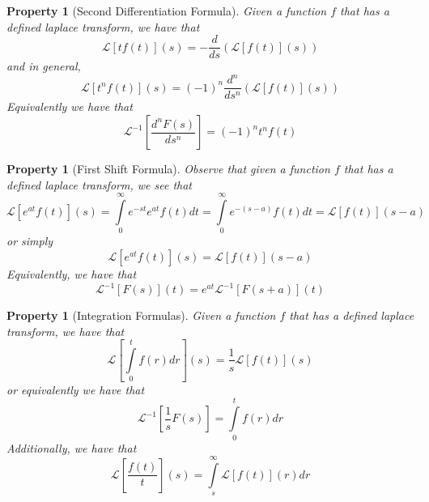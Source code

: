\documentclass[12pt]{article}
\newtheorem{pro}[thm]{Property}
\theoremstyle{definition}
\theoremstyle{remark}
\numberwithin{equation}{section}
\begin{document}
\begin{pro}[Second Differentiation Formula]
        Given a function $f$ that has a defined laplace transform, we have that \begin{equation}
                \mathcal{L}[tf(t)](s) = -\frac{d}{ds}\left(\mathcal{L}[f(t)](s)\right)
        \end{equation}
        and in general, \begin{equation}
                \mathcal{L}[t^nf(t)](s) = (-1)^n\frac{d^n}{ds^n}\left(\mathcal{L}[f(t)](s)\right)
        \end{equation}
        Equivalently we have that \begin{equation}
                \mathcal{L}^{-1}\left[\frac{d^nF(s)}{ds^n}\right] = (-1)^nt^nf(t)
        \end{equation}
\end{pro}


\vspace{1cm}


\begin{pro}[First Shift Formula]
        Observe that given a function $f$ that has a defined laplace transform, we see that \begin{equation}
                \mathcal{L}[e^{at}f(t)](s) = \int\limits_0^{\infty}e^{-st}e^{at}f(t)dt = \int\limits_0^{\infty}e^{-(s-a)}f(t)dt = \mathcal{L}[f(t)](s-a)
        \end{equation}
        or simply \begin{equation}
                \mathcal{L}[e^{at}f(t)](s) = \mathcal{L}[f(t)](s-a)
        \end{equation}
        Equivalently, we have that \begin{equation}
                \mathcal{L}^{-1}[F(s)](t) = e^{at}\mathcal{L}^{-1}[F(s+a)](t)
        \end{equation}
\end{pro}


\vspace{1cm}


\begin{pro}[Integration Formulas]
        Given a function $f$ that has a defined laplace transform, we have that \begin{equation}
                \mathcal{L}\left[\int\limits_0^tf(r)dr\right](s) = \frac{1}{s}\mathcal{L}[f(t)](s)
        \end{equation}
        or equivalently we have that \begin{equation}
                \mathcal{L}^{-1}\left[\frac{1}{s}F(s)\right] = \int\limits_0^tf(r)dr
        \end{equation}
        Additionally, we have that \begin{equation}
                \mathcal{L}\left[\frac{f(t)}{t}\right](s) = \int\limits_s^{\infty}\mathcal{L}[f(t)](r)dr
        \end{equation}
\end{pro}
\end{document}
